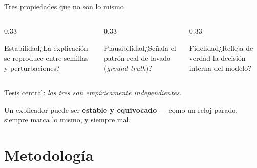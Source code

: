 \documentclass[aspectratio=169,11pt]{beamer}
\begin{document}
\begin{frame}{Tres propiedades que no son lo mismo}
\begin{columns}[T]
\begin{column}{0.33\textwidth}
\begin{block}{Estabilidad}\small ¿La explicación se reproduce entre semillas y perturbaciones?\end{block}
\end{column}
\begin{column}{0.33\textwidth}
\begin{block}{Plausibilidad}\small ¿Señala el patrón real de lavado (\emph{ground-truth})?\end{block}
\end{column}
\begin{column}{0.33\textwidth}
\begin{block}{Fidelidad}\small ¿Refleja de verdad la decisión interna del modelo?\end{block}
\end{column}
\end{columns}
\vspace{0.8em}
\begin{center}\large
\alert{Tesis central:} \emph{las tres son empíricamente independientes.}
\end{center}
\vspace{0.3em}
{\footnotesize\color{muted} Un explicador puede ser \textbf{estable y equivocado} --- como un reloj parado: siempre marca lo mismo, y siempre mal.}
\end{frame}

\section{Metodología}
\end{document}

